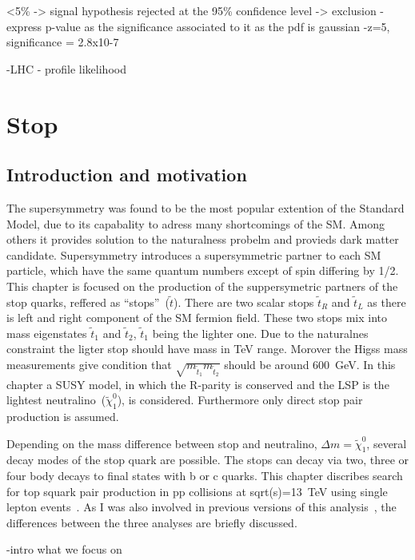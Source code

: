 <5\% -> signal hypothesis rejected at the 95\% confidence level -> exclusion
- express p-value as the significance associated to it as the pdf is gaussian
-z=5, significance = 2.8x10-7

-LHC - profile likelihood\chapter{Stop}

\section{Introduction and motivation}

The supersymmetry was found to be the most popular extention of the Standard Model, due to its capabality to adress many shortcomings of the SM. Among others it provides solution to the naturalness probelm and provieds dark matter candidate. Supersymmetry introduces a supersymmetric partner to each SM particle, which have the same quantum numbers except of spin differing by 1/2. This chapter is focused on the production of the suppersymetric partners of the stop quarks, reffered as ``stops''~($\tilde{t}$). There are two scalar stops $\tilde{t}_{R}$ and  $\tilde{t}_{L}$ as there is left and right component of the SM fermion field. These two stops mix into mass eigenstates $\tilde{t}_{1}$ and $\tilde{t}_{2}$,  $\tilde{t}_{1}$ being the lighter one. Due to the naturalnes constraint the ligter stop should have mass in TeV range. Morover the Higss mass measurements give condition that $\sqrt{m_{\tilde{t}_{1}} m_{\tilde{t}_{2}}}$ should be around 600~GeV. In this chapter a SUSY model, in which the R-parity is conserved and the LSP is the lightest neutralino~($\tilde{\chi}^{0}_{1}$), is considered. Furthermore only direct stop pair production is assumed.

Depending on the mass difference between stop and neutralino, $\Delta m =  \tilde{\chi}^{0}_{1}$, several decay modes of the stop quark are possible. The stops can decay via two, three or four body decays to final states with b or c quarks. This chapter discribes search for top squark pair production in pp collisions at sqrt(s)=13~TeV using single lepton events~\cite{Sirunyan:2017xse}. As I was also involved in previous versions of this analysis~\cite{Sirunyan:2016jpr, CMS:2016vew}, the differences between the three analyses are briefly discussed.



-intro what we focus on

